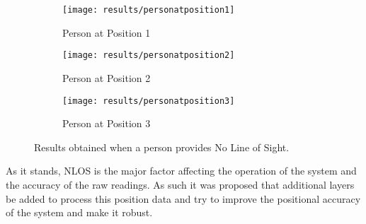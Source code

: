 \begin{figure}[h!]
    \centering
    \begin{subfigure}{0.45\textwidth}
            \texttt{[image: results/personatposition1]}
            \caption{Person at Position 1}
    \end{subfigure}
    \begin{subfigure}{0.45\textwidth}
            \texttt{[image: results/personatposition2]}
            \caption{Person at Position 2}
    \end{subfigure}
    \begin{subfigure}{0.45\textwidth}
            \texttt{[image: results/personatposition3]}
            \caption{Person at Position 3}
    \end{subfigure}
    \caption{Results obtained when a person provides No Line of Sight.}
    \label{fig:persons}
\end{figure}
As it stands, NLOS is the major factor affecting the operation of the system and the accuracy of the raw readings.
As such it was proposed that additional layers be added to process this position data and try to improve the positional accuracy of the system and make it robust.

